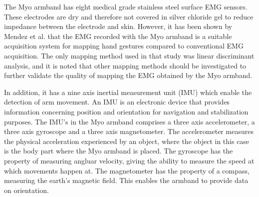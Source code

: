 The Myo armband has eight medical grade stainless steel surface EMG sensors. %
These electrodes are dry and therefore not covered in silver chloride gel to reduce impedance between the electrode and skin. However, it has been shown by Mendez et al. \cite{Mendez2017} that the EMG recorded with the Myo armband is a suitable acquisition system for mapping hand gestures compared to conventional EMG acquisition. The only mapping method used in that study was linear discriminant analysis, and it is noted that other mapping methods should be investigated to further validate the quality of mapping the EMG obtained by the Myo armband. 

In addition, it has a nine axis inertial measurement unit (IMU) which enable the detection of arm movement. An IMU is an electronic device that provides information concerning position and orientation for navigation and stabilization purposes. The IMU's in the Myo armband comprises a three axis accelerometer, a three axis gyroscope and a three axis magnetometer. The accelerometer measures the physical acceleration experienced by an object, where the object in this case is the body part where the Myo armband is placed. 
The gyroscope has the property of measuring angluar velocity, giving the ability to measure the speed at which movements happen at. The magnetometer has the property of a compass, measuring the earth's magnetic field. This enables the armband to provide data on orientation. 


